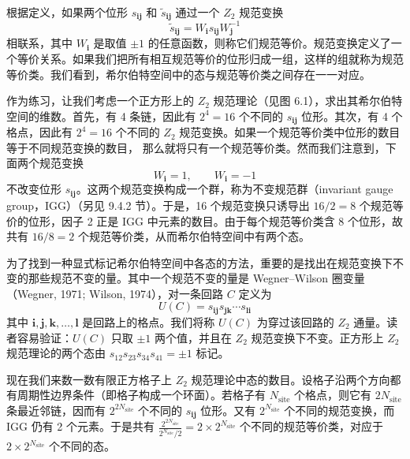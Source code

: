 根据定义，如果两个位形 $s_{\pmb{ij}}$ 和 $\tilde{s}_{\pmb{ij}}$ 通过一个 $Z_2$ 规范变换
\begin{equation*}
\tilde{s}_{\pmb{ij}} = W_{\pmb{i}} s_{\pmb{ij}} W_{\pmb{j}}^{-1}\tag{6.2.1}
\end{equation*}
相联系，其中 $W_{\pmb{i}}$ 是取值 $\pm 1$ 的任意函数，则称它们规范等价。规范变换定义了一个等价关系。如果我们把所有相互规范等价的位形归成一组，这样的组就称为规范等价类。我们看到，希尔伯特空间中的态与规范等价类之间存在一一对应。

作为练习，让我们考虑一个正方形上的 $Z_2$ 规范理论（见图 6.1），求出其希尔伯特空间的维数。首先，有 4 条链，因此有 $2^4 = 16$ 个不同的 $s_{\pmb{ij}}$ 位形。其次，有 4 个格点，因此有 $2^4 = 16$ 个不同的 $Z_2$ 规范变换。如果一个规范等价类中位形的数目等于不同规范变换的数目，
那么就将只有一个规范等价类。然而我们注意到，下面两个规范变换
\begin{equation*}
W_{\pmb{i}} = 1, \qquad W_{\pmb{i}} = -1
\end{equation*}
不改变位形 $s_{\pmb{ij}}$。这两个规范变换构成一个群，称为不变规范群（invariant gauge group，IGG）（另见 9.4.2 节）。于是，16 个规范变换只诱导出 $16/2 = 8$ 个规范等价的位形，因子 2 正是 IGG 中元素的数目。由于每个规范等价类含 8 个位形，故共有 $16/8 = 2$ 个规范等价类，从而希尔伯特空间中有两个态。

为了找到一种显式标记希尔伯特空间中各态的方法，重要的是找出在规范变换下不变的那些规范不变的量。其中一个规范不变的量是 Wegner--Wilson 圈变量（Wegner, 1971; Wilson, 1974），对一条回路 $C$ 定义为
\begin{equation*}
U(C) = s_{\pmb{ij}} s_{\pmb{jk}} \cdots s_{\pmb{li}}
\end{equation*}
其中 $\pmb{i}, \pmb{j}, \pmb{k}, \ldots, \pmb{l}$ 是回路上的格点。我们将称 $U(C)$ 为穿过该回路的 $Z_2$ 通量。读者容易验证：$U(C)$ 只取 $\pm 1$ 两个值，并且在 $Z_2$ 规范变换下不变。正方形上 $Z_2$ 规范理论的两个态由 $s_{12}s_{23}s_{34}s_{41} = \pm 1$ 标记。

现在我们来数一数有限正方格子上 $Z_2$ 规范理论中态的数目。设格子沿两个方向都有周期性边界条件（即格子构成一个环面）。若格子有 $N_{\text{site}}$ 个格点，则它有 $2N_{\text{site}}$ 条最近邻链，因而有 $2^{2N_{\text{site}}}$ 个不同的 $s_{\pmb{ij}}$ 位形。又有 $2^{N_{\text{site}}}$ 个不同的规范变换，而 IGG 仍有 2 个元素。于是共有 $\frac{2^{2N_{\text{site}}}}{2^{N_{\text{site}}}/2} = 2 \times 2^{N_{\text{site}}}$ 个不同的规范等价类，对应于 $2 \times 2^{N_{\text{site}}}$ 个不同的态。

